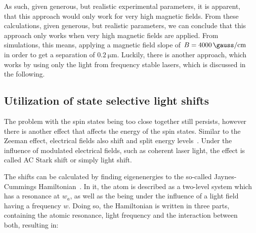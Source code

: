 As such, given generous, but realistic experimental parameters, it is apparent, that this approach would only work for very high magnetic fields.
From these calculations, given generous, but realistic parameters, we can conclude that this approach only works when very high magnetic fields are applied. From simulations, this means, applying a magnetic field slope of $B=\SI{4000}{\gauss\per\centi\meter}$ in order to get a separation of $\SI{0.2}{\micro\meter}$. Luckily, there is another approach, which works by using only the light from frequency stable lasers, which is discussed in the following.

\begin{figure}[t]%
\end{figure}

\subsection{Utilization of state selective light shifts}

The problem with the spin states being too close together still persists, however there is another effect that affects the energy of the spin states. Similar to the Zeeman effect, electrical fields also shift and split energy levels~\cite{Voigt, Courtney1995}. Under the influence of modulated electrical fields, such as coherent laser light, the effect is called AC Stark shift or simply light shift.

The shifts can be calculated by finding eigenenergies to the so-called Jaynes-Cummings Hamiltonian~\cite{Fox2006}. In it, the atom is described as a two-level system which has a resonance at $w_a$, as well as the being under the influence of a light field having a frequency $w$. Doing so, the Hamiltonian is written in three parts, containing the atomic resonance, light frequency and the interaction between both, resulting in:


